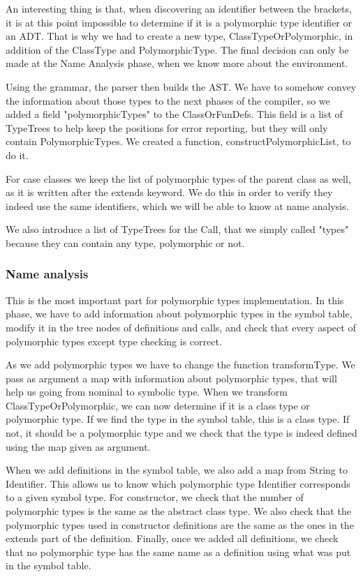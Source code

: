 An interesting thing is that, when discovering an identifier between the brackets, it is at this point impossible to determine if it is a polymorphic type identifier or an ADT. That is why we had to create a new type, ClassTypeOrPolymorphic, in addition of the ClassType and PolymorphicType. The final decision can only be made at the Name Analysis phase, when we know more about the environment.

Using the grammar, the parser then builds the AST. We have to somehow convey the information about those types to the next phases of the compiler, so we added a field "polymorphicTypes" to the ClassOrFunDefs. This field is a list of TypeTrees to help keep the positions for error reporting, but they will only contain PolymorphicTypes. We created a function, constructPolymorphicList, to do it.

For case classes we keep the list of polymorphic types of the parent class as well, as it is written after the extends keyword. We do this in order to verify they indeed use the same identifiers, which we will be able to know at name analysis.

We also introduce a list of TypeTrees for the Call, that we simply called "types" because they can contain any type, polymorphic or not.

\subsubsection{Name analysis}
This is the most important part for polymorphic types implementation. In this phase, we have to add information about polymorphic types in the symbol table, modify it in the tree nodes of definitions and calls, and check that every aspect of polymorphic types except type checking is correct.

As we add polymorphic types we have to change the function transformType. We pass as argument a map with information about polymorphic types, that will help us going from nominal to symbolic type. When we transform ClassTypeOrPolymorphic, we can now determine if it is a class type or polymorphic type. If we find the type in the symbol table, this is a class type. If not, it should be a polymorphic type and we check that the type is indeed defined using the map given as argument.

When we add definitions in the symbol table, we also add a map from String to Identifier. This allows us to know which polymorphic type Identifier corresponds to a given symbol type. For constructor, we check that the number of polymorphic types is the same as the abstract class type. We also check that the polymorphic types used in constructor definitions are the same as the ones in the extends part of the definition. Finally, once we added all definitions, we check that no polymorphic type has the same name as a definition using what was put in the symbol table.

